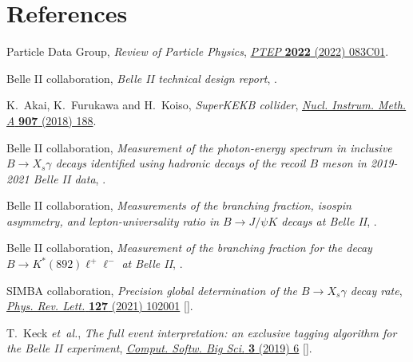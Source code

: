 \documentclass{moriond}
\begin{document}
\section*{References}
\begin{thebibliography}{99}
{Particle Data Group}, \emph{{Review of Particle Physics}},
  \href{https://doi.org/10.1093/ptep/ptac097}{\emph{PTEP} {\bfseries 2022}
  (2022) 083C01}.

{Belle II} collaboration, \emph{{Belle II technical design report}},
  \href{https://arxiv.org/abs/1011.0352}{{}}.

K.~Akai, K.~Furukawa and H.~Koiso, \emph{{SuperKEKB collider}},
  \href{https://doi.org/https://doi.org/10.1016/j.nima.2018.08.017}{\emph{Nucl.
  Instrum. Meth. A} {\bfseries 907} (2018) 188}.

{Belle II} collaboration, \emph{{Measurement of the photon-energy spectrum in
  inclusive $B\to X_s\gamma$ decays identified using hadronic decays of the
  recoil $B$ meson in 2019-2021 Belle II data}},
  \href{https://arxiv.org/abs/2210.10220}{{}}.

{Belle II} collaboration, \emph{{Measurements of the branching fraction,
  isospin asymmetry, and lepton-universality ratio in $B \to J/\psi K$ decays
  at Belle II}},  \href{https://arxiv.org/abs/2207.11275}{{}}.

{Belle II} collaboration, \emph{{Measurement of the branching fraction for the
  decay $B \to K^{\ast}(892)\ell^+\ell^-$ at Belle II}},
  \href{https://arxiv.org/abs/2206.05946}{{}}.

{SIMBA} collaboration, \emph{{Precision global determination of the $B\to
  X_s\gamma$ decay rate}},
  \href{https://doi.org/10.1103/PhysRevLett.127.102001}{\emph{Phys. Rev. Lett.}
  {\bfseries 127} (2021) 102001}
  [\href{https://arxiv.org/abs/2007.04320}{{}}].

T.~Keck {\textit{et~al.}}, \emph{{The full event interpretation}: {an exclusive
  tagging algorithm for the Belle II experiment}},
  \href{https://doi.org/10.1007/s41781-019-0021-8}{\emph{Comput. Softw. Big
  Sci.} {\bfseries 3} (2019) 6}
  [\href{https://arxiv.org/abs/1807.08680}{{}}].


\end{thebibliography}
\end{document}

